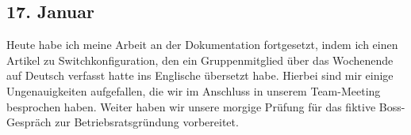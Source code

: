 \subsection{17. Januar}
Heute habe ich meine Arbeit an der Dokumentation fortgesetzt, indem ich einen Artikel zu Switchkonfiguration, den ein Gruppenmitglied über das Wochenende auf Deutsch verfasst hatte ins Englische übersetzt habe. Hierbei sind mir einige Ungenauigkeiten aufgefallen, die wir im Anschluss in unserem Team-Meeting besprochen haben. Weiter haben wir unsere morgige Prüfung für das fiktive Boss-Gespräch zur Betriebsratsgründung vorbereitet.